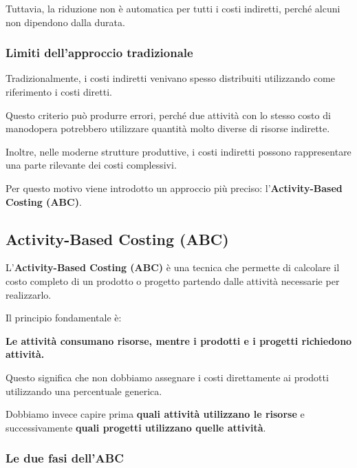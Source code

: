 \noindent Tuttavia, la riduzione non è automatica
per tutti i costi indiretti, perché alcuni
non dipendono dalla durata.

\subsubsection*{Limiti dell'approccio tradizionale}

\noindent Tradizionalmente, i costi indiretti
venivano spesso distribuiti utilizzando
come riferimento i costi diretti.

\noindent Questo criterio può produrre errori,
perché due attività con lo stesso costo
di manodopera potrebbero utilizzare
quantità molto diverse di risorse indirette.

\medskip

\noindent Inoltre, nelle moderne strutture produttive,
i costi indiretti possono rappresentare
una parte rilevante dei costi complessivi.

\noindent Per questo motivo viene introdotto
un approccio più preciso:
l'\textbf{Activity-Based Costing (ABC)}.


\subsection{Activity-Based Costing (ABC)}

\noindent L'\textbf{Activity-Based Costing (ABC)}
è una tecnica che permette di calcolare
il costo completo di un prodotto o progetto
partendo dalle attività necessarie
per realizzarlo.

\medskip

\noindent Il principio fondamentale è:

\begin{center}
\textbf{Le attività consumano risorse,
mentre i prodotti e i progetti richiedono attività.}
\end{center}

\noindent Questo significa che non dobbiamo
assegnare i costi direttamente ai prodotti
utilizzando una percentuale generica.

\noindent Dobbiamo invece capire prima
\textbf{quali attività utilizzano le risorse}
e successivamente \textbf{quali progetti
utilizzano quelle attività}.

\subsubsection*{Le due fasi dell'ABC}

